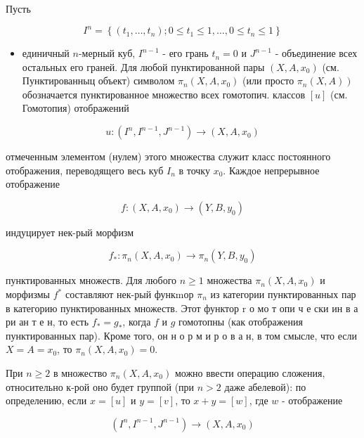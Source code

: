 \documentclass[10pt]{article}
\begin{document}
Пусть



\[

I^{n}=\left\{\left(t_{1}, \ldots, t_{n}\right) ; 0 \leqslant t_{1} \leqslant 1, \ldots, 0 \leqslant t_{n} \leqslant 1\right\}

\]



\begin{itemize}

  \item единичный $n$-мерный куб, $I^{n-1}$ - его грань $t_{n}=0$ и $J^{n-1}$ - объединение всех остальных его граней. Для любой пунктированной пары $\left(X, A, x_{0}\right)$ (см. Пунктированныц объект) символом $\pi_{n}\left(X, A, x_{0}\right)$ (или просто $\left.\pi_{n}(X, A)\right)$ обозначается пунктированное множество всех гомотопич. классов $[u]$ (см. Гомотопия) отображений

\end{itemize}



\[

u:\left(I^{n}, I^{n-1}, J^{n-1}\right) \longrightarrow\left(X, A, x_{0}\right)

\]



отмеченным элементом (нулем) этого множества служит класс постоянного отображения, переводящего весь куб $I_{n}$ в точку $x_{0}$. Каждое непрерывное отображение



\[

f:\left(X, A, x_{0}\right) \rightarrow\left(Y, B, y_{0}\right)

\]



индуцирует нек-рый морфизм



\[

f_{*}: \pi_{n}\left(X, A, x_{0}\right) \longrightarrow \pi_{n}\left(Y, B, y_{0}\right)

\]



пунктированных множеств. Для любого $n \geqslant 1$ множества $\pi_{n}\left(X, A, x_{0}\right)$ и морфизмы $f^{*}$ составляют нек-рый функmор $\pi_{n}$ из категории пунктированных пар в категорию пунктированных множеств. Этот функтор $\mathrm{r}$ о мо т опи ч е ски ин в а ри ан т е н, то есть $f_{*}=g_{*}$, когда $f$ и $g$ гомотопны (как отображения пунктированных пар). Кроме того, он н о р м и р о в а н, в том смысле, что если $X=A=x_{0}$, то $\pi_{n}\left(X, A, x_{0}\right)=0$.



При $n \geqslant 2$ в множество $\pi_{n}\left(X, A, x_{0}\right)$ можно ввести операцию сложения, относительно к-рой оно будет группой (при $n>2$ даже абелевой): по определению, если $x=[u]$ и $y=[v]$, то $x+y=[w]$, где $w$ - отображение



\[

\left(I^{n}, I^{n-1}, J^{n-1}\right) \longrightarrow\left(X, A, x_{0}\right)

\]
\end{document}
